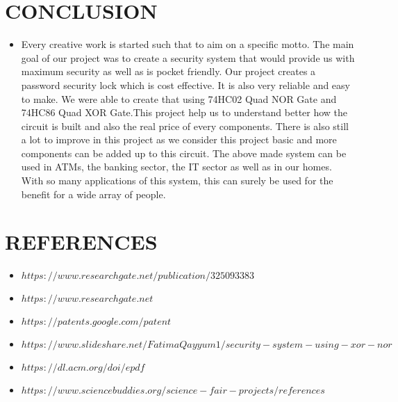 \documentclass{article}
\begin{document}
\section{CONCLUSION}
\begin{itemize}
\item Every creative work is started such that to aim on a specific motto. The main goal of our project was to create a security system that would provide us with maximum security as well as is pocket friendly. Our project creates a password security lock which is cost effective. It is also very reliable and easy to make. We were able to create that using 74HC02 Quad NOR Gate and 74HC86 Quad XOR Gate.This project help us to understand better how the circuit is built and also the real price of every components. There is also still a lot to improve in this project as we consider this project basic and more components can be added up to this circuit. The above made system can be used in ATMs, the banking sector, the IT sector as well as in our homes. With so many applications of this system, this can surely be used for the benefit for a wide array of people.
\end{itemize}
\section{REFERENCES}
\begin{itemize}
\item $ https://www.researchgate.net/publication/325093383 $
\item $https://www.researchgate.net$
\item $https://patents.google.com/patent$
\item $https://www.slideshare.net/FatimaQayyum1/security-system-using-xor-nor$
\item $https://dl.acm.org/doi/epdf$
\item $https://www.sciencebuddies.org/science-fair-projects/references$

\end{itemize}
\end{document}
